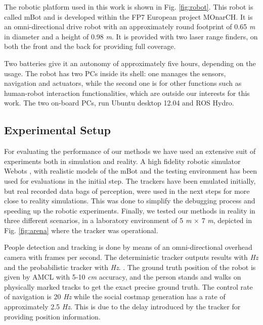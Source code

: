 The robotic platform used in this work is shown in Fig. \ref{fig:robot}. This robot is called mBot \cite{Messias2014robotic} and is developed within the FP7 European project MOnarCH.
It is an omni-directional drive robot with an approximately round footprint of 0.65 \textit{m} in diameter and a height of 0.98 \textit{m}.
It is provided with two laser range finders, on both the front and the back for providing full coverage.

Two batteries give it an autonomy of approximately five hours, depending on the usage.
The robot has two PCs inside its shell: one manages the sensors, navigation and actuators, while the second one is for other functions such as human-robot interaction functionalities, which are outside our interests for this work. The two on-board PCs, run Ubuntu desktop 12.04 and ROS Hydro. 


\subsection{Experimental Setup}
\label{sec:Experimental_setup}


For evaluating the performance of our methods we have used an extensive suit of experiments both in simulation and reality. A high fidelity robotic simulator Webots \cite{michel1998webots}, with realistic models of the mBot and the testing environment has been used for evaluations in the initial step. The trackers have been emulated initially, but real recorded data bags of perception, were used in the next steps for more close to reality simulations. This was done to simplify the debugging process and speeding up the robotic experiments. %
Finally, we tested our methods in reality in three different scenarios, in a laboratory environment of 5 \textit{m} $\times$ 7 \textit{m}, depicted in Fig. \ref{fig:arena} where the tracker was operational.
 


People detection and tracking is done by means of an omni-directional overhead camera  with  frames per second. The deterministic tracker outputs results with   \textit{Hz} and the probabilistic tracker with   \textit{Hz}.  . The ground truth position of the robot is given by AMCL with 5-10 \textit{cm} accuracy, and the person stands and walks on physically marked tracks to get the exact precise ground truth.
The control rate of navigation is 20 \textit{Hz} while the social costmap generation has a rate of approximately 2.5 \textit{Hz}. This is due to the delay introduced by the tracker for providing position information.


